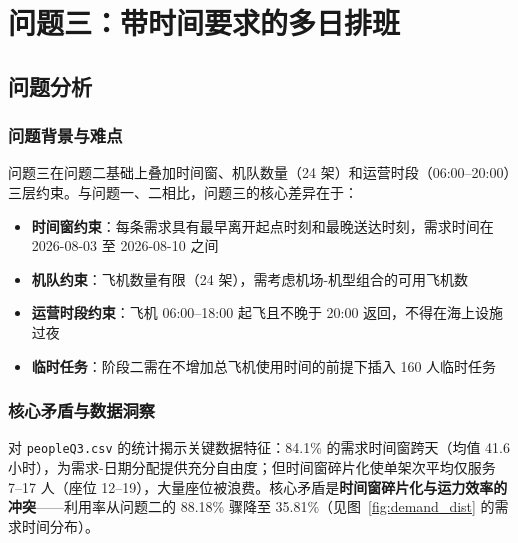 
\section{问题三：带时间要求的多日排班}

\subsection{问题分析}

\subsubsection{问题背景与难点}

问题三在问题二基础上叠加时间窗、机队数量（24 架）和运营时段（06:00--20:00）三层约束。与问题一、二相比，问题三的核心差异在于：

\begin{itemize}
\item \textbf{时间窗约束}：每条需求具有最早离开起点时刻和最晚送达时刻，需求时间在 2026-08-03 至 2026-08-10 之间
\item \textbf{机队约束}：飞机数量有限（24 架），需考虑机场-机型组合的可用飞机数
\item \textbf{运营时段约束}：飞机 06:00--18:00 起飞且不晚于 20:00 返回，不得在海上设施过夜
\item \textbf{临时任务}：阶段二需在不增加总飞机使用时间的前提下插入 160 人临时任务
\end{itemize}

\subsubsection{核心矛盾与数据洞察}

对 \texttt{peopleQ3.csv} 的统计揭示关键数据特征：84.1\% 的需求时间窗跨天（均值 41.6 小时），为需求-日期分配提供充分自由度；但时间窗碎片化使单架次平均仅服务 7--17 人（座位 12--19），大量座位被浪费。核心矛盾是\textbf{时间窗碎片化与运力效率的冲突}——利用率从问题二的 88.18\% 骤降至 35.81\%（见图~\ref{fig:demand_dist} 的需求时间分布）。
